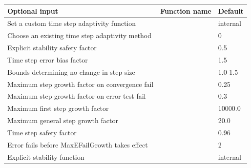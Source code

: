 \documentclass[letterpaper,10pt,english]{sphinxmanual}
\begin{document}
\begin{tabulary}{\linewidth}{|L|L|L|}
\hline
\textbf{
Optional input
} & \textbf{
Function name
} & \textbf{
Default
}\\\hline

Set a custom time step adaptivity function
 & 
{\hyperref[c_interface/User_callable:ARKodeSetAdaptivityFn]{}}
 & 
internal
\\\hline

Choose an existing time step adaptivity method
 & 
{\hyperref[c_interface/User_callable:ARKodeSetAdaptivityMethod]{}}
 & 
0
\\\hline

Explicit stability safety factor
 & 
{\hyperref[c_interface/User_callable:ARKodeSetCFLFraction]{}}
 & 
0.5
\\\hline

Time step error bias factor
 & 
{\hyperref[c_interface/User_callable:ARKodeSetErrorBias]{}}
 & 
1.5
\\\hline

Bounds determining no change in step size
 & 
{\hyperref[c_interface/User_callable:ARKodeSetFixedStepBounds]{}}
 & 
1.0  1.5
\\\hline

Maximum step growth factor on convergence fail
 & 
{\hyperref[c_interface/User_callable:ARKodeSetMaxCFailGrowth]{}}
 & 
0.25
\\\hline

Maximum step growth factor on error test fail
 & 
{\hyperref[c_interface/User_callable:ARKodeSetMaxEFailGrowth]{}}
 & 
0.3
\\\hline

Maximum first step growth factor
 & 
{\hyperref[c_interface/User_callable:ARKodeSetMaxFirstGrowth]{}}
 & 
10000.0
\\\hline

Maximum general step growth factor
 & 
{\hyperref[c_interface/User_callable:ARKodeSetMaxGrowth]{}}
 & 
20.0
\\\hline

Time step safety factor
 & 
{\hyperref[c_interface/User_callable:ARKodeSetSafetyFactor]{}}
 & 
0.96
\\\hline

Error fails before MaxEFailGrowth takes effect
 & 
{\hyperref[c_interface/User_callable:ARKodeSetSmallNumEFails]{}}
 & 
2
\\\hline

Explicit stability function
 & 
{\hyperref[c_interface/User_callable:ARKodeSetStabilityFn]{}}
 & 
internal
\\\hline
\end{tabulary}
\end{document}
